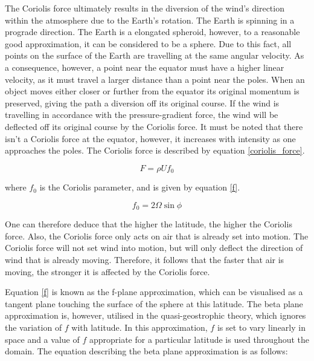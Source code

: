 The Coriolis force ultimately results in the diversion of the wind's direction within the atmosphere due to the Earth's rotation. The Earth is spinning in a prograde direction. The Earth is a elongated spheroid, however, to a reasonable good approximation, it can be considered to be a sphere. Due to this fact, all points on the surface of the Earth are travelling at the same angular velocity. As a consequence, however, a point near the equator must have a higher linear velocity, as it must travel a larger distance than a point near the poles. When an object moves either closer or further from the equator its original momentum is preserved, giving the path a diversion off its original course\cite{corioliseffect_def}. If the wind is travelling in accordance with the pressure-gradient force, the wind will be deflected off its original course by the Coriolis force. It must be noted that there isn't a Coriolis force at the equator, however, it increases with intensity as one approaches the poles. The Coriolis force is described by equation \ref{coriolis_force}.

\begin{equation}
    \label{coriolis_force}
    F = \rho U f_0
\end{equation}

where $f_0$ is the Coriolis parameter, and is given by equation \ref{f}.

\begin{equation}
    \label{f}
    f_0 = 2 \Omega \sin{\phi}
\end{equation}

One can therefore deduce that the higher the latitude, the higher the Coriolis force. Also, the Coriolis force only acts on air that is already set into motion. The Coriolis force will not set wind into motion, but will only deflect the direction of wind that is already moving. Therefore, it follows that the faster that air is moving, the stronger it is affected by the Coriolis force\cite{coriolis_effect}. 

Equation \ref{f} is known as the f-plane approximation, which can be visualised as a tangent plane touching the surface of the sphere at this latitude. The beta plane approximation is, however, utilised in the quasi-geostrophic theory, which ignores the variation of $f$ with latitude. In this approximation, $f$ is set to vary linearly in space and a value of $f$ appropriate for a particular latitude is used throughout the domain. The equation describing the beta plane approximation is as follows:

